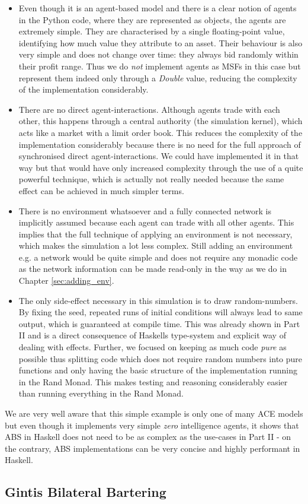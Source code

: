 \begin{itemize}
	\item Even though it is an agent-based model and there is a clear notion of agents in the Python code, where they are represented as objects, the agents are extremely simple. They are characterised by a single floating-point value, identifying how much value they attribute to an asset. Their behaviour is also very simple and does not change over time: they always bid randomly within their profit range. Thus we do \textit{not} implement agents as MSFs in this case but represent them indeed only through a \textit{Double} value, reducing the complexity of the implementation considerably.

	\item There are no direct agent-interactions. Although agents trade with each other, this happens through a central authority (the simulation kernel), which acts like a market with a limit order book. This reduces the complexity of the implementation considerably because there is no need for the full approach of synchronised direct agent-interactions. We could have implemented it in that way but that would have only increased complexity through the use of a quite powerful technique, which is actually not really needed because the same effect can be achieved in much simpler terms.

	\item There is no environment whatsoever and a fully connected network is implicitly assumed because each agent can trade with all other agents. This implies that the full technique of applying an environment is not necessary, which makes the simulation a lot less complex. Still adding an environment e.g. a network would be quite simple and does not require any monadic code as the network information can be made read-only in the way as we do in Chapter \ref{sec:adding_env}.
	
	\item The only side-effect necessary in this simulation is to draw random-numbers. By fixing the seed, repeated runs of initial conditions will always lead to same output, which is guaranteed at compile time. This was already shown in Part II and is a direct consequence of Haskells type-system and explicit way of dealing with effects.	 Further, we focused on keeping as much code \textit{pure} as possible thus splitting code which does not require random numbers into pure functions and only having the basic structure of the implementation running in the Rand Monad. This makes testing and reasoning considerably easier than running everything in the Rand Monad.
\end{itemize}

We are very well aware that this simple example is only one of many ACE models but even though it implements very simple \textit{zero} intelligence agents, it shows that ABS in Haskell does not need to be as complex as the use-cases in Part II - on the contrary, ABS implementations can be very concise and highly performant in Haskell.

\subsection{Gintis Bilateral Bartering}